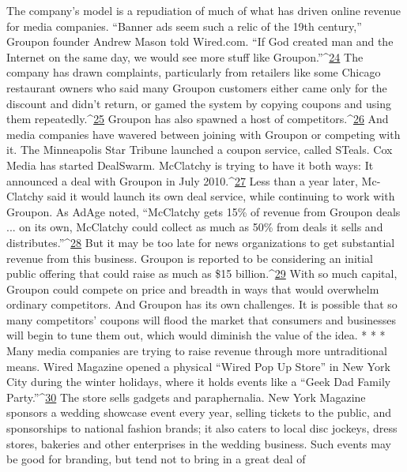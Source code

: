 The company's model is a repudiation of much of what has driven online revenue
for media companies. ``Banner ads seem such a relic of the 19th century,''
Groupon founder Andrew Mason told Wired.com. ``If God created man and the
Internet on the same day, we would see more stuff like Groupon.''^{\href{#endnotes-chapter-8}{24}}
The company has drawn complaints, particularly from retailers like some Chicago
restaurant owners who said many Groupon customers either came only for
the discount and didn't return, or gamed the system by copying coupons and
using them repeatedly.^{\href{#endnotes-chapter-8}{25}} Groupon has also spawned a host of competitors.^{\href{#endnotes-chapter-8}{26}} And
media companies have wavered between joining with Groupon or competing
with it.
The Minneapolis Star Tribune launched a coupon service, called STeals.
Cox Media has started DealSwarm. McClatchy is trying to have it both ways:
It announced a deal with Groupon in July 2010.^{\href{#endnotes-chapter-8}{27}} Less than a year later, Mc-
Clatchy said it would launch its own deal service, while continuing to work
with Groupon. As AdAge noted, ``McClatchy gets 15\% of revenue from Groupon
deals ... on its own, McClatchy could collect as much as 50\% from deals
it sells and distributes.''^{\href{#endnotes-chapter-8}{28}}
But it may be too late for news organizations to get substantial revenue from
this business. Groupon is reported to be considering an initial public offering
that could raise as much as \$15 billion.^{\href{#endnotes-chapter-8}{29}} With so much capital, Groupon could
compete on price and breadth in ways that would overwhelm ordinary competitors.
And Groupon has its own challenges. It is possible that so many competitors'
coupons will flood the market that consumers and businesses will begin to tune
them out, which would diminish the value of the idea.
* * *
Many media companies are trying to raise revenue through more untraditional
means. Wired Magazine opened a physical ``Wired Pop Up Store'' in New York
City during the winter holidays, where it holds events like a ``Geek Dad Family
Party.''^{\href{#endnotes-chapter-8}{30}} The store sells gadgets and paraphernalia. New York Magazine sponsors a
wedding showcase event every year, selling tickets to the public, and sponsorships
to national fashion brands; it also caters to local disc jockeys, dress stores, bakeries
and other enterprises in the wedding business.
Such events may be good for branding, but tend not to bring in a great deal of
